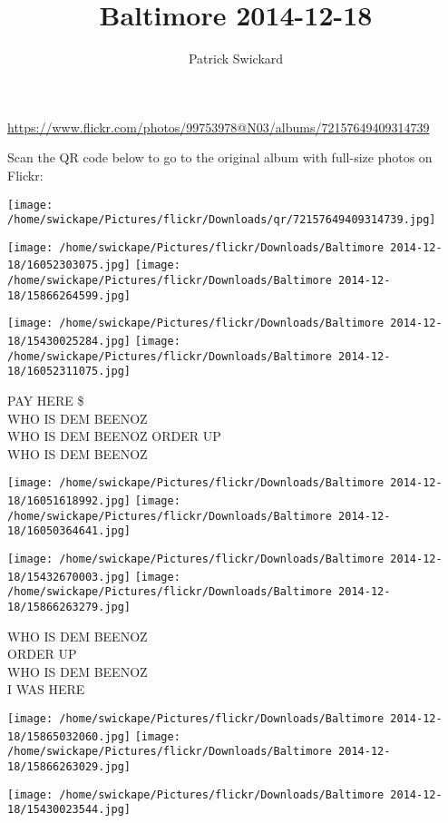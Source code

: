 \documentclass[10pt,letterpaper]{article}
\title{Baltimore 2014-12-18}
\author{Patrick Swickard}
\date{}
\begin{document}
\maketitle

\url{https://www.flickr.com/photos/99753978@N03/albums/72157649409314739}

Scan the QR code below to go to the original album with full-size photos on Flickr:

\texttt{[image: /home/swickape/Pictures/flickr/Downloads/qr/72157649409314739.jpg]}
\pagebreak

\texttt{[image: /home/swickape/Pictures/flickr/Downloads/Baltimore 2014-12-18/16052303075.jpg]}
\texttt{[image: /home/swickape/Pictures/flickr/Downloads/Baltimore 2014-12-18/15866264599.jpg]}

\texttt{[image: /home/swickape/Pictures/flickr/Downloads/Baltimore 2014-12-18/15430025284.jpg]}
\texttt{[image: /home/swickape/Pictures/flickr/Downloads/Baltimore 2014-12-18/16052311075.jpg]}

PAY HERE \$\\
WHO IS DEM BEENOZ\\
WHO IS DEM BEENOZ ORDER UP\\
WHO IS DEM BEENOZ
\pagebreak

\texttt{[image: /home/swickape/Pictures/flickr/Downloads/Baltimore 2014-12-18/16051618992.jpg]}
\texttt{[image: /home/swickape/Pictures/flickr/Downloads/Baltimore 2014-12-18/16050364641.jpg]}

\texttt{[image: /home/swickape/Pictures/flickr/Downloads/Baltimore 2014-12-18/15432670003.jpg]}
\texttt{[image: /home/swickape/Pictures/flickr/Downloads/Baltimore 2014-12-18/15866263279.jpg]}

WHO IS DEM BEENOZ\\
ORDER UP\\
WHO IS DEM BEENOZ\\
I WAS HERE
\pagebreak

\texttt{[image: /home/swickape/Pictures/flickr/Downloads/Baltimore 2014-12-18/15865032060.jpg]}
\texttt{[image: /home/swickape/Pictures/flickr/Downloads/Baltimore 2014-12-18/15866263029.jpg]}

\vspace{0.25in}
\texttt{[image: /home/swickape/Pictures/flickr/Downloads/Baltimore 2014-12-18/15430023544.jpg]}
\end{document}
